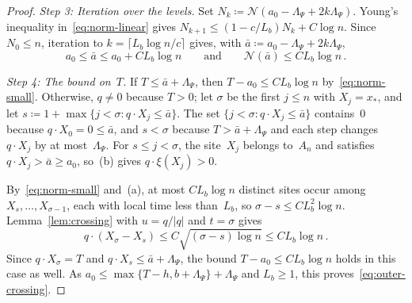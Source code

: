 \documentclass[11pt]{amsart}
\theoremstyle{plain}
\theoremstyle{definition}
\newcommand{\gauge}{\Psi}
\numberwithin{equation}{section}
\begin{document}
\begin{proof}
\emph{Step 3: Iteration over the levels.} Set $N_k\coloneqq\mathcal N(a_0-\Lambda_\gauge+2k\Lambda_\gauge)$. Young's inequality in~\eqref{eq:norm-linear} gives $N_{k+1}\leq(1-c/L_b)N_k+C\log n$. Since $N_0\leq n$, iteration to $k=\lceil L_b\log n/c\rceil$ gives, with $\bar a\coloneqq a_0-\Lambda_\gauge+2k\Lambda_\gauge$,
\begin{equation}\label{eq:norm-small}
a_0\leq\bar a\leq a_0+CL_b\log n\qquad\text{and}\qquad\mathcal N(\bar a)\leq CL_b\log n\, .
\end{equation}

\emph{Step 4: The bound on~$T$.} If $T\leq\bar a+\Lambda_\gauge$, then $T-a_0\leq CL_b\log n$ by~\eqref{eq:norm-small}. Otherwise, $q\neq0$ because $T>0$; let $\sigma$ be the first $j\leq n$ with $X_j=x_*$, and let $s\coloneqq1+\max\{j<\sigma:q\cdot X_j\leq\bar a\}$. The set $\{j<\sigma:q\cdot X_j\leq\bar a\}$ contains~$0$ because $q\cdot X_0=0\leq\bar a$, and $s<\sigma$ because $T>\bar a+\Lambda_\gauge$ and each step changes $q\cdot X_j$ by at most~$\Lambda_\gauge$. For $s\leq j<\sigma$, the site~$X_j$ belongs to~$A_n$ and satisfies $q\cdot X_j>\bar a\geq a_0$, so~(b) gives $q\cdot\xi(X_j)>0$.

By~\eqref{eq:norm-small} and~(a), at most $CL_b\log n$ distinct sites occur among $X_s,\ldots,X_{\sigma-1}$, each with local time less than~$L_b$, so $\sigma-s\leq CL_b^2\log n$. Lemma~\ref{lem:crossing} with $u=q/|q|$ and $t=\sigma$ gives $$q\cdot(X_\sigma-X_s)\leq C\sqrt{(\sigma-s)\log n}\leq CL_b\log n \,.$$ Since $q\cdot X_\sigma=T$ and $q\cdot X_s\leq\bar a+\Lambda_\gauge$, the bound $T-a_0\leq CL_b\log n$ holds in this case as well. As $a_0\leq\max\{T-h,b+\Lambda_\gauge\}+\Lambda_\gauge$ and $L_b\geq1$, this proves~\eqref{eq:outer-crossing}.
\end{proof}
\end{document}
